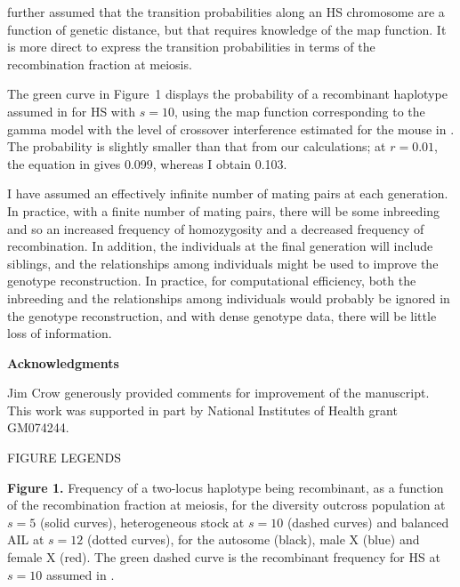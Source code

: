 \documentclass[12pt,letterpaper,pdftex]{article}
\newenvironment{hanging}
{\begin{list}{}
        {\setlength{\labelwidth}{0in}
         \setlength{\leftmargin}{1em}
         \setlength{\itemindent}{-1em}
        }
}
{\end{list}}
\begin{document}
\citet{Mott2000} further assumed that the transition probabilities
along an HS chromosome are a function of genetic distance, but that
requires knowledge of the map function.  It is more
direct to express the transition probabilities in terms of the
recombination fraction at meiosis.

The green curve in Figure~1 displays the probability of a recombinant
haplotype assumed in \cite{Mott2000} for HS with $s=10$, using 
the map function corresponding to the gamma model with the level of
crossover interference estimated for the mouse in \citet{Broman2002}.
The probability is slightly smaller than that from our calculations; at
$r=0.01$, the equation in \citet{Mott2000} gives 0.099, whereas I
obtain 0.103.

I have assumed an effectively infinite number of mating pairs at each
generation.  In practice, with a finite number of mating pairs, there
will be some inbreeding and so an increased frequency of homozygosity
and a decreased frequency of recombination.  In addition, the
individuals at the final generation will include siblings, and the
relationships among individuals might be used to improve the
genotype reconstruction.  In practice, for computational efficiency,
both the inbreeding and the relationships among individuals would
probably be ignored in the genotype reconstruction, and with dense
genotype data, there will be little loss of information.


\bigskip \bigskip \bigskip

\noindent \textbf{\sffamily Acknowledgments}
\bigskip

Jim Crow generously provided comments for improvement of
the manuscript.  
This work was supported in part by
National Institutes of Health grant GM074244.




\newpage 


\clearpage

\renewcommand*{\refname}{\normalsize\sffamily Literature Cited}



\newpage


\centerline{FIGURE LEGENDS}

\begin{hanging}

\item \textbf{Figure 1.}  
  Frequency of a two-locus haplotype being recombinant, as a function
  of the recombination fraction at meiosis, for the diversity outcross
  population at $s=5$ (solid curves), heterogeneous stock at $s=10$
  (dashed curves) and balanced AIL at $s=12$ (dotted curves), for the autosome
  (black), male X (blue) and female X (red).  The green dashed curve is
  the recombinant frequency for HS at $s=10$ assumed in
  \citet{Mott2000}.


\end{hanging}
\end{document}
